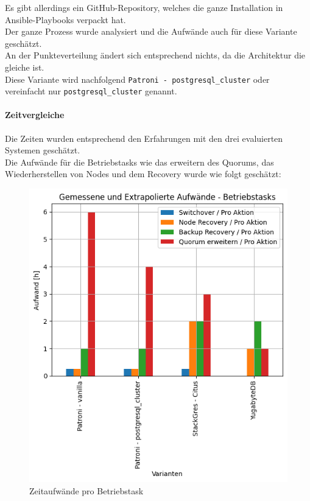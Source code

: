 \begin{flushleft}
    Es gibt allerdings ein \Gls{GitHub}-Repository, welches die ganze Installation in \Gls{Ansible}-Playbooks verpackt hat.\\
    Der ganze Prozess wurde analysiert und die Aufwände auch für diese Variante geschätzt.\\
    An der Punkteverteilung ändert sich entsprechend nichts, da die Architektur die gleiche ist.\\
    Diese Variante wird nachfolgend \texttt{Patroni - postgresql\_cluster} oder vereinfacht nur \texttt{postgresql\_cluster} genannt.
    \paragraph{Zeitvergleiche}
    Die Zeiten wurden entsprechend den Erfahrungen mit den drei evaluierten Systemen geschätzt.\\

    
    Die Aufwände für die Betriebstasks wie das erweitern des Quorums, das Wiederherstellen von Nodes und dem Recovery wurde wie folgt geschätzt:
    \begin{figure}[H]
        \centering
        \includegraphics[width=1\linewidth]{source/pandas_data_chart_plotter/time_investment_action}
        \caption{Zeitaufwände pro Betriebstask}
        \label{fig:time_investment_action}
    \end{figure}
\end{flushleft}
